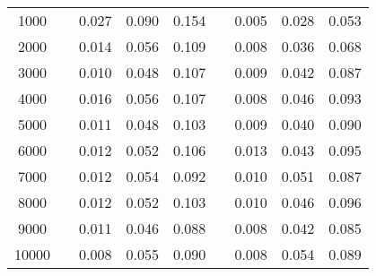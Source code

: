% 
\begin{tabular}{ccccccccc}
  \hline
  \hline
1000 &  & 0.027 & 0.090 & 0.154 &  & 0.005 & 0.028 & 0.053 \\ 
  2000 &  & 0.014 & 0.056 & 0.109 &  & 0.008 & 0.036 & 0.068 \\ 
  3000 &  & 0.010 & 0.048 & 0.107 &  & 0.009 & 0.042 & 0.087 \\ 
  4000 &  & 0.016 & 0.056 & 0.107 &  & 0.008 & 0.046 & 0.093 \\ 
  5000 &  & 0.011 & 0.048 & 0.103 &  & 0.009 & 0.040 & 0.090 \\ 
  6000 &  & 0.012 & 0.052 & 0.106 &  & 0.013 & 0.043 & 0.095 \\ 
  7000 &  & 0.012 & 0.054 & 0.092 &  & 0.010 & 0.051 & 0.087 \\ 
  8000 &  & 0.012 & 0.052 & 0.103 &  & 0.010 & 0.046 & 0.096 \\ 
  9000 &  & 0.011 & 0.046 & 0.088 &  & 0.008 & 0.042 & 0.085 \\ 
  10000 &  & 0.008 & 0.055 & 0.090 &  & 0.008 & 0.054 & 0.089 \\ 
   \hline
\end{tabular}
